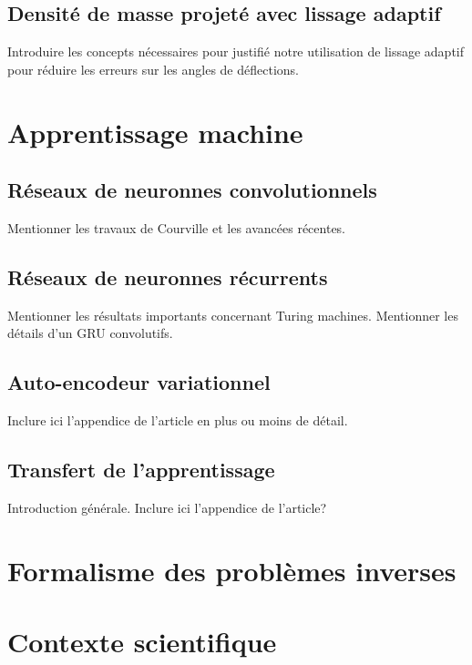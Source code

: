 
\subsection{Densité de masse projeté avec lissage adaptif}
Introduire les concepts nécessaires pour justifié notre utilisation de 
lissage adaptif pour réduire les erreurs sur les angles de déflections.


\section{Apprentissage machine}\label{sec:apprentissage machine}

\subsection{Réseaux de neuronnes convolutionnels}
Mentionner les travaux de Courville et les avancées récentes.

\subsection{Réseaux de neuronnes récurrents}
Mentionner les résultats importants concernant Turing machines. 
Mentionner les détails d'un GRU convolutifs.



\subsection{Auto-encodeur variationnel}
Inclure ici l'appendice de l'article en plus ou moins de détail.

\subsection{Transfert de l'apprentissage}
Introduction générale.
Inclure ici l'appendice de l'article?

\section{Formalisme des problèmes inverses}\label{sec:formalisme probleme inverse}





\section{Contexte scientifique}\label{sec:contexte}



